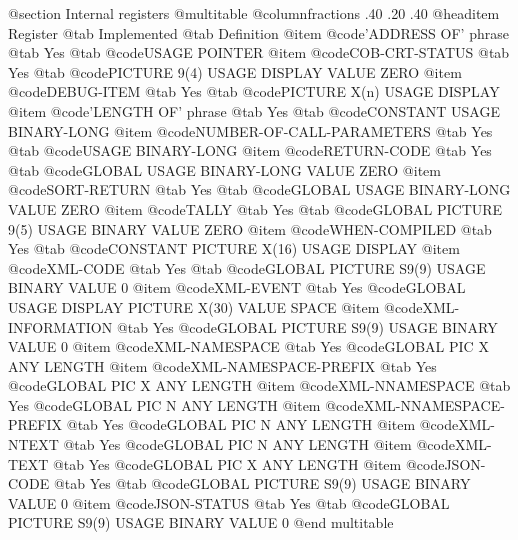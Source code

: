@section Internal registers
@multitable @columnfractions .40 .20 .40
@headitem Register @tab Implemented @tab Definition
@item @code{'ADDRESS OF' phrase} @tab Yes @tab @code{USAGE POINTER}
@item @code{COB-CRT-STATUS} @tab Yes @tab @code{PICTURE 9(4) USAGE DISPLAY VALUE ZERO}
@item @code{DEBUG-ITEM} @tab Yes @tab @code{PICTURE X(n) USAGE DISPLAY}
@item @code{'LENGTH OF' phrase} @tab Yes @tab @code{CONSTANT USAGE BINARY-LONG}
@item @code{NUMBER-OF-CALL-PARAMETERS} @tab Yes @tab @code{USAGE BINARY-LONG}
@item @code{RETURN-CODE} @tab Yes @tab @code{GLOBAL USAGE BINARY-LONG VALUE ZERO}
@item @code{SORT-RETURN} @tab Yes @tab @code{GLOBAL USAGE BINARY-LONG VALUE ZERO}
@item @code{TALLY} @tab Yes @tab @code{GLOBAL PICTURE 9(5) USAGE BINARY VALUE ZERO}
@item @code{WHEN-COMPILED} @tab Yes @tab @code{CONSTANT PICTURE X(16) USAGE DISPLAY}
@item @code{XML-CODE} @tab Yes @tab @code{GLOBAL PICTURE S9(9) USAGE BINARY VALUE 0}
@item @code{XML-EVENT} @tab Yes @code{GLOBAL USAGE DISPLAY PICTURE X(30) VALUE SPACE}
@item @code{XML-INFORMATION} @tab Yes @code{GLOBAL PICTURE S9(9) USAGE BINARY VALUE 0}
@item @code{XML-NAMESPACE} @tab Yes @code{GLOBAL PIC X ANY LENGTH}
@item @code{XML-NAMESPACE-PREFIX} @tab Yes @code{GLOBAL PIC X ANY LENGTH}
@item @code{XML-NNAMESPACE} @tab Yes @code{GLOBAL PIC N ANY LENGTH}
@item @code{XML-NNAMESPACE-PREFIX} @tab Yes @code{GLOBAL PIC N ANY LENGTH}
@item @code{XML-NTEXT} @tab Yes @code{GLOBAL PIC N ANY LENGTH}
@item @code{XML-TEXT} @tab Yes @code{GLOBAL PIC X ANY LENGTH}
@item @code{JSON-CODE} @tab Yes @tab @code{GLOBAL PICTURE S9(9) USAGE BINARY VALUE 0}
@item @code{JSON-STATUS} @tab Yes @tab @code{GLOBAL PICTURE S9(9) USAGE BINARY VALUE 0}
@end multitable
